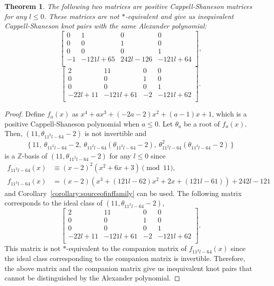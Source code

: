 \documentclass[12pt]{amsart}
\theoremstyle{plain}
\newtheorem{theorem}{Theorem}[section]
\theoremstyle{definition}
\theoremstyle{remark}
\renewcommand{\(}{\big(}
\renewcommand{\)}{\big)}
\theoremstyle{plain}
\theoremstyle{definition}
\begin{document}
\begin{theorem}
    The following two matrices are positive Cappell-Shaneson matrices for any $l \le 0$. These matrices are not $*$-equivalent and give us inequivalent Cappell-Shaneson knot pairs with the same Alexander polynomial:
    \[
        \begin{bmatrix}
    		0 & 1 & 0 & 0 \\
    		0 & 0 & 1 & 0 \\
    		0 & 0 & 0 & 1\\
            -1 & -121l+65 & 242l-126 & -121l+64\\
    		\end{bmatrix},
    \]
      \[
        \begin{bmatrix}
    		2 & 11 & 0 & 0 \\
    		0 & 0 & 1 & 0 \\
    		0 & 0 & 0 & 1\\
            -22l+11 & -121l+61 & -2 & -121l+62\\
    		\end{bmatrix}.
    \]

\end{theorem}
\begin{proof}
    Define $f_a(x)$ as $x^4+ax^3+(-2a-2)x^2+(a-1)x+1$, which is a positive Cappell-Shaneson polynomial when $a \le 0$. Let $\theta_a$ be a root of $f_a(x)$. Then, $(11, \theta_{11^2l-64} - 2)$ is not invertible and 
    \[
    \begin{aligned}
    \{\, 11, \ \theta_{11^2l-64} - 2, \ \theta_{11^2l-64} ( \theta_{11^2l-64} - 2), \ \theta_{11^2l-64}^2 (\theta_{11^2l-64} - 2)\, \}
    \end{aligned}
    \]
    is a $\mathbb{Z}$-basis of $(11, \theta_{11^2l-64} - 2 )$ for any $l \le 0$ since
    \begin{align*}
        f_{11^2l-64}(x)&\equiv (x-2)^2(x^2+6x+3) \pmod {11} ,\\
        f_{11^2l-64}(x) &= (x-2)(x^3+(121l-62)x^2+2x+(121l-61))+242l-121
    \end{align*}
    and Corollary~\ref{corollary:sourceofinffamily} can be used. The following matrix corresponds to the ideal class of $(11, \theta_{11^2l-64} - 2)$,
      \[
        \begin{bmatrix}
    		2 & 11 & 0 & 0 \\
    		0 & 0 & 1 & 0 \\
    		0 & 0 & 0 & 1\\
            -22l+11 & -121l+61 & -2 & -121l+62\\
    		\end{bmatrix}.
    \]
    This matrix is not $*$-equivalent to the companion matrix of $f_{11^2l-64}(x)$ since the ideal class corresponding to the companion matrix is invertible. Therefore, the above matrix and the companion matrix give us inequivalent knot pairs that cannot be distinguished by the Alexander polynomial.
\end{proof}
\end{document}
